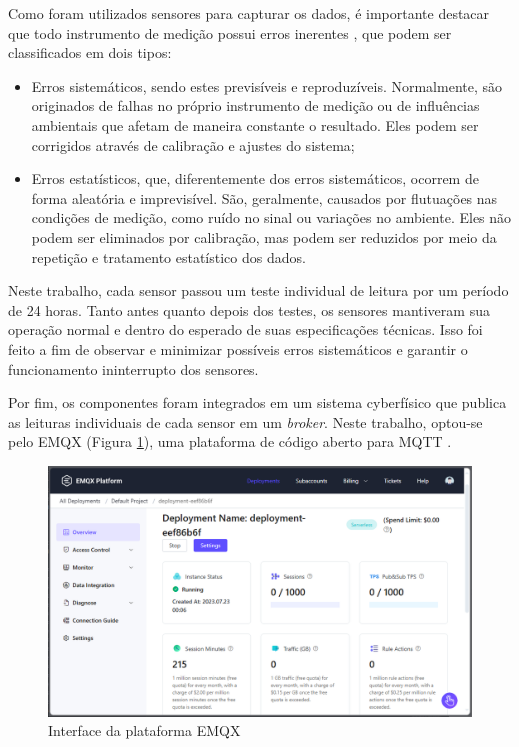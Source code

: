 Como foram utilizados sensores para capturar os dados, é importante destacar que todo instrumento de medição possui erros inerentes \parencite{Vuolo_erro1996}, que podem ser classificados em dois tipos:

\begin{itemize} 
    \item Erros sistemáticos, sendo estes previsíveis e reproduzíveis. Normalmente, são originados de falhas no próprio instrumento de medição ou de influências ambientais que afetam de maneira constante o resultado. Eles podem ser corrigidos através de calibração e ajustes do sistema;
    \item Erros estatísticos, que, diferentemente dos erros sistemáticos, ocorrem de forma aleatória e imprevisível. São, geralmente, causados por flutuações nas condições de medição, como ruído no sinal ou variações no ambiente. Eles não podem ser eliminados por calibração, mas podem ser reduzidos por meio da repetição e tratamento estatístico dos dados. 
\end{itemize}

Neste trabalho, cada sensor passou um teste individual de leitura por um período de 24 horas. Tanto antes quanto depois dos testes, os sensores mantiveram sua operação normal e dentro do esperado de suas especificações técnicas. Isso foi feito a fim de observar e minimizar possíveis erros sistemáticos e garantir o funcionamento ininterrupto dos sensores.

Por fim, os componentes foram integrados em um sistema cyberfísico que publica as leituras individuais de cada sensor em um \textit{broker}. Neste trabalho, optou-se pelo EMQX (Figura \ref{figura:emqx}), uma plataforma de código aberto para MQTT \parencite{EMQX}.

\begin{figure}[!htb] \centering
  \caption{Interface da plataforma EMQX} \label{figura:emqx}
  \begin{varwidth}{\linewidth}
    \includegraphics[width=16cm]{figuras/emqx.png}
  \end{varwidth}
\end{figure}

